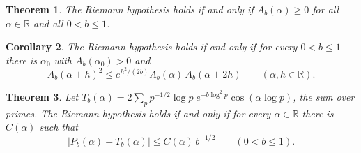 \documentclass[11pt]{amsart}
\newtheorem{theorem}{Theorem}
\newtheorem{corollary}[theorem]{Corollary}
\theoremstyle{remark}
\newcommand{\R}{\mathbb{R}}
\begin{document}
\begin{theorem}\label{thm:main}
The Riemann hypothesis holds if and only if $A_b(\alpha)\ge0$ for all $\alpha\in\R$ and all $0<b\le1$.
\end{theorem}

\begin{corollary}\label{cor:two}
The Riemann hypothesis holds if and only if for every $0<b\le1$ there is $\alpha_0$ with $A_b(\alpha_0)>0$ and
\begin{equation}\label{eq:two}
A_b(\alpha+h)^2\le e^{h^2/(2b)}A_b(\alpha)\,A_b(\alpha+2h)\qquad(\alpha,h\in\R).
\end{equation}
\end{corollary}

\begin{theorem}\label{thm:primes}
Let $T_b(\alpha)=2\sum_{p}p^{-1/2}\log p\;e^{-b\log^2p}\cos(\alpha\log p)$, the sum over primes. The Riemann
hypothesis holds if and only if for every $\alpha\in\R$ there is $C(\alpha)$ such that
\begin{equation}\label{eq:primes}
\big|P_b(\alpha)-T_b(\alpha)\big|\le C(\alpha)\,b^{-1/2}\qquad(0<b\le1).
\end{equation}
\end{theorem}
\end{document}
